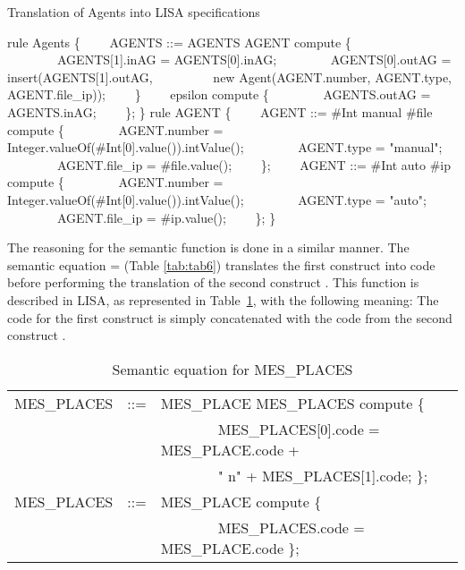 \documentclass[preprint, prX]{revtex4}
\begin{document}
\begin{algorithm}[tbh]
\caption{Translation of Agents into LISA specifications}
\label{alg:agent_lisa}
\scriptsize
\begin{algorithmic}[1]
\STATE rule Agents \{
\STATE \ \ \ \ AGENTS ::= AGENTS  AGENT compute \{
\STATE \ \ \ \ \ \ \ \ AGENTS[1].inAG = AGENTS[0].inAG;
\STATE \ \ \ \ \ \ \ \ AGENTS[0].outAG = insert(AGENTS[1].outAG,
\STATE \ \ \ \ \ \ \ \ \ new Agent(AGENT.number, AGENT.type, AGENT.file\_ip));
\STATE \ \ \ \ \}
\STATE \ \ \ \  epsilon compute \{
\STATE \ \ \ \ \ \ \ \ AGENTS.outAG = AGENTS.inAG;
\STATE \ \ \ \ \};
\STATE \}
\STATE rule AGENT \{
\STATE \ \ \ \ AGENT ::= \#Int manual \#file \; compute \{
\STATE \ \ \ \ \ \ \ \ AGENT.number = Integer.valueOf(\#Int[0].value()).intValue();
\STATE \ \ \ \ \ \ \ \ AGENT.type = "manual";
\STATE \ \ \ \ \ \ \ \ AGENT.file\_ip = \#file.value();
\STATE \ \ \ \ \};
\STATE \ \ \ \ AGENT ::= \#Int auto \#ip \; compute \{
\STATE \ \ \ \ \ \ \ \ AGENT.number = Integer.valueOf(\#Int[0].value()).intValue();
\STATE \ \ \ \ \ \ \ \ AGENT.type = "auto";
\STATE \ \ \ \ \ \ \ \ AGENT.file\_ip = \#ip.value();
\STATE \ \ \ \ \};
\STATE \}
\end{algorithmic}
\normalsize
\end{algorithm}

The reasoning for the semantic function  is done in a similar manner. The semantic equation  =  (Table \ref{tab:tab6}) translates the first construct  into code before performing the translation of the second construct . This function is described in LISA, as represented in Table~\ref{tab:tab25b}, with the following meaning: The code for the first construct  is simply concatenated with the code from the second construct .

\begin{table}[htb]           \caption{Semantic equation for MES\_PLACES}
\label{tab:tab25b}
\vspace{-5mm}
\footnotesize
\begin{center}
\begin{tabular}{ | l  l  l | }
\hline
MES\_PLACES & ::= & MES\_PLACE MES\_PLACES compute \{ \\
 & & \ \ \ \ \ \ \ \ MES\_PLACES[0].code = MES\_PLACE.code + \\
 & & \ \ \ \ \ \ \ \ " n"  + MES\_PLACES[1].code; \}; \\
MES\_PLACES & ::= & MES\_PLACE compute \{ \\
 & & \ \ \ \ \ \ \ \ MES\_PLACES.code = MES\_PLACE.code \}; \\
\hline
\end{tabular}
\end{center}
\normalsize
\vspace{-5mm}
\end{table}
\end{document}
